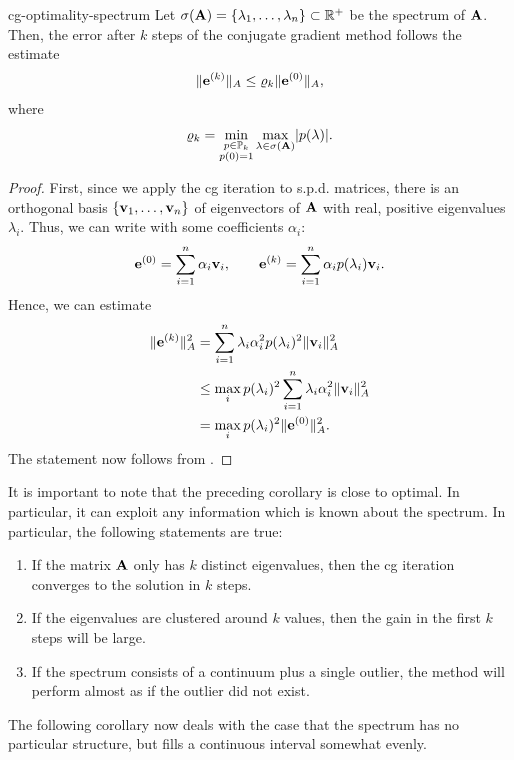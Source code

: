 \begin{Corollary}{cg-optimality-spectrum}
  Let $\sigma(\mathbf A) = \{\lambda_1,\dots,\lambda_n\} \subset \mathbb R^+$ be
  the spectrum of $\mathbf A$. Then, the error after $k$ steps of the
  conjugate gradient method follows the estimate
  \begin{gather}
    \lVert\mathbf e^{(k)}\rVert_A \le \varrho_k \lVert\mathbf e^{(0)}\rVert_A,
  \end{gather}
  where
  \begin{gather}
    \varrho_k = \min_{\substack{p\in\mathbb P_k\\p(0) = 1}} \max_{\lambda\in\sigma(\mathbf A)} \lvert p(\lambda)\rvert.
  \end{gather}
\end{Corollary}

\begin{proof}
  First, since we apply the cg iteration to s.p.d. matrices, there is
  an orthogonal basis $\{\mathbf v_1,\dots,\mathbf v_n\}$ of eigenvectors of
  $\mathbf A$ with real, positive eigenvalues $\lambda_i$. Thus, we can
  write with some coefficients $\alpha_i$:
  \begin{gather}
    \mathbf e^{(0)} = \sum_{i=1}^n \alpha_i \mathbf v_i,
    \qquad
    \mathbf e^{(k)} = \sum_{i=1}^n \alpha_i p(\lambda_i) \mathbf v_i.    
  \end{gather}
  Hence, we can estimate
  \begin{align}
    \lVert\mathbf e^{(k)}\rVert_A^2
    &= \sum_{i=1}^n \lambda_i\alpha_i^2 p(\lambda_i)^2 \lVert\mathbf v_i\rVert_A^2\\
    & \le \max_i p(\lambda_i)^2 \sum_{i=1}^n \lambda_i\alpha_i^2\lVert\mathbf v_i\rVert_A^2\\
    &= \max_i p(\lambda_i)^2 \lVert\mathbf e^{(0)}\rVert_A^2.
  \end{align}
  The statement now follows from .
\end{proof}

\begin{remark}
  It is important to note that the preceding corollary is close to
  optimal. In particular, it can exploit any information which is
  known about the spectrum. In particular, the following statements are true:
  \begin{enumerate}
  \item If the matrix $\mathbf A$ only has $k$ distinct eigenvalues, then
    the cg iteration converges to the solution in $k$ steps.
  \item If the eigenvalues are clustered around $k$ values, then the
    gain in the first $k$ steps will be large.
  \item If the spectrum consists of a continuum plus a single outlier,
    the method will perform almost as if the outlier did not exist.
  \end{enumerate}
  The following corollary now deals with the case that the spectrum
  has no particular structure, but fills a continuous interval
  somewhat evenly.
\end{remark}

